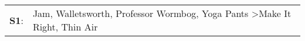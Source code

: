 \begin{supertabular}{p{0.03\textwidth}p{0.92\textwidth}}
 \textbf{S1}:  &  Jam\textsuperscript{}, \enspace Walletsworth\textsuperscript{}, \enspace Professor Wormbog\textsuperscript{}, \enspace Yoga Pants\textsuperscript{} \textgreater \enspace Make It Right\textsuperscript{}, \enspace Thin Air\textsuperscript{}  \enspace  \\
\end{supertabular}
